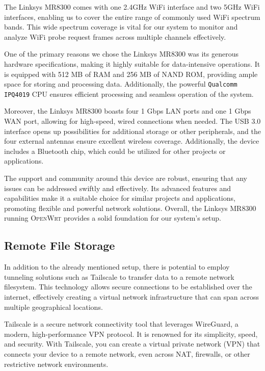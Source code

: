 \documentclass{article}
\begin{document}
The Linksys MR8300 comes with one 2.4GHz WiFi interface and two 5GHz WiFi interfaces, enabling us to cover the entire range of commonly used WiFi spectrum bands. This wide spectrum coverage is vital for our system to monitor and analyze WiFi probe request frames across multiple channels effectively.

One of the primary reasons we chose the Linksys MR8300 was its generous hardware specifications, making it highly suitable for data-intensive operations. It is equipped with 512 MB of RAM and 256 MB of NAND ROM, providing ample space for storing and processing data. Additionally, the powerful \texttt{Qualcomm IPQ4019} CPU ensures efficient processing and seamless operation of the system.

Moreover, the Linksys MR8300 boasts four 1 Gbps LAN ports and one 1 Gbps WAN port, allowing for high-speed, wired connections when needed. The USB 3.0 interface opens up possibilities for additional storage or other peripherals, and the four external antennas ensure excellent wireless coverage. Additionally, the device includes a Bluetooth chip, which could be utilized for other projects or applications.

The support and community around this device are robust, ensuring that any issues can be addressed swiftly and effectively. Its advanced features and capabilities make it a suitable choice for similar projects and applications, promoting flexible and powerful network solutions. Overall, the Linksys MR8300 running \textsc{OpenWrt} provides a solid foundation for our system's setup.

\subsection{Remote File Storage}

In addition to the already mentioned setup, there is potential to employ tunneling solutions such as Tailscale to transfer data to a remote network filesystem. This technology allows secure connections to be established over the internet, effectively creating a virtual network infrastructure that can span across multiple geographical locations.

Tailscale is a secure network connectivity tool that leverages WireGuard, a modern, high-performance VPN protocol. It is renowned for its simplicity, speed, and security. With Tailscale, you can create a virtual private network (VPN) that connects your device to a remote network, even across NAT, firewalls, or other restrictive network environments.
\end{document}
